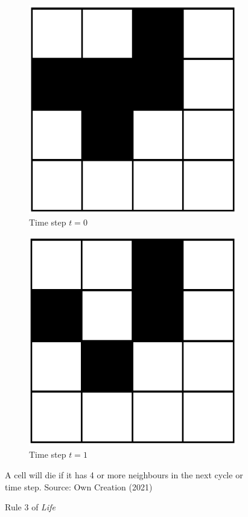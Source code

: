 \begin{figure}[H]
\centering
\begin{subfigure}{.5\textwidth}
  \centering
  \includegraphics[width=.4\linewidth]{Figures/Chapter2/rule3}
  \caption{Time step $t = 0$}
\end{subfigure}%
\begin{subfigure}{.5\textwidth}
  \centering
  \includegraphics[width=.4\linewidth]{Figures/Chapter2/rule3.1}
  \caption{Time step $t = 1$}
\end{subfigure}
\caption{Rule 3 of \textsl{Life}}
\begin{center}
A cell will die if it has 4 or more neighbours in the next cycle or time step.
Source: Own Creation (2021)
\end{center}
\end{figure}

